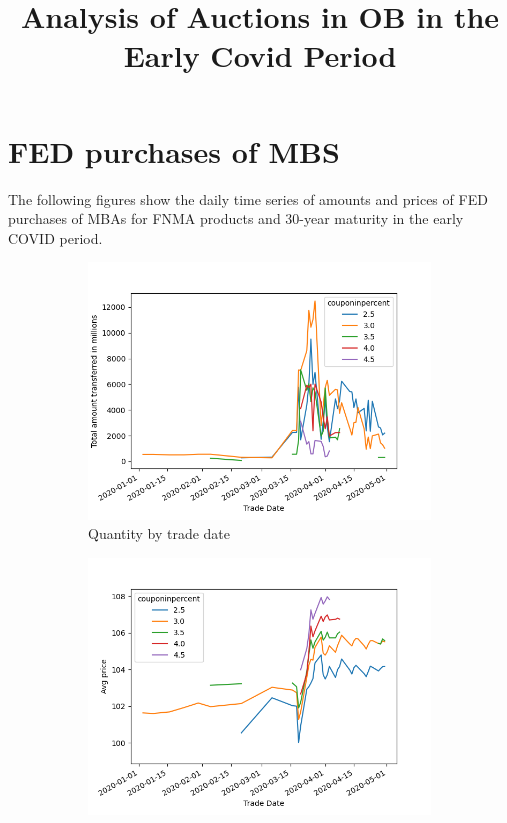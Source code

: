 \documentclass[11pt,a4paper]{article}
\begin{document}
\title{Analysis of Auctions in OB in the Early Covid Period}

\maketitle



\section{FED purchases of MBS}

The following figures show the daily time series of amounts and prices of FED purchases of MBAs for FNMA products and 30-year maturity in the early COVID period.

\begin{figure}[h]
    \centering
    \begin{subfigure}[b]{0.49\textwidth}
      \includegraphics[width=0.998\textwidth]{../results/figures/FNMA_daily_purchases_tradedate_amount.png}
      \caption{ Quantity by trade date}
     \end{subfigure}
     \begin{subfigure}[b]{0.49\textwidth}
      \includegraphics[width=0.998\textwidth]{../results/figures/FNMA_daily_purchases_tradedate_price.png}

\end{subfigure}
\end{figure}
\end{document}
